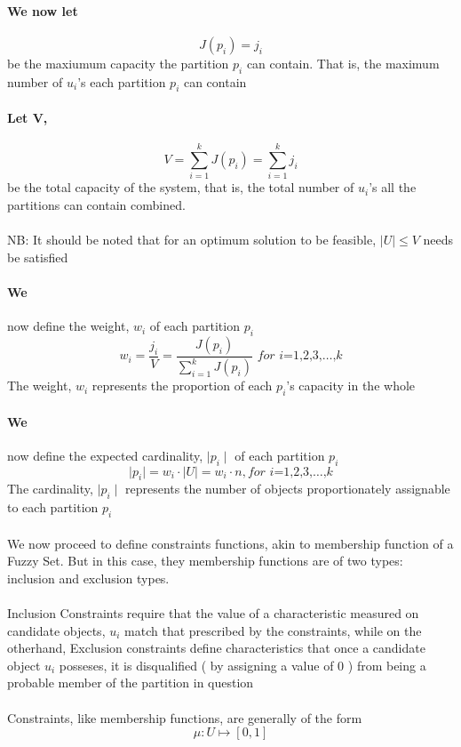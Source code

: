 \documentclass[a4paper]{book}
\begin{document}
		\paragraph{We now let}
			\begin{equation}
				J(p_i) = j_i
			\end{equation}
			be the maxiumum capacity the partition $p_i$ can contain. That is, the maximum number of $u_i$'s each partition $p_i$ can contain
		\paragraph{Let V,}
			\begin{equation}
				V = \sum_{ i = 1 }^{k}{J(p_i)} = \sum_{i=1}^{k}{j_i}
			\end{equation}
			be the total capacity of the system, that is, the total number of $u_i$'s all the partitions can contain combined.\\ \\
			NB: It should be noted that for an optimum solution to be feasible, $\mid U \mid \leq V$ needs be satisfied
		\paragraph{We}
			now define the weight, $w_i$ of each partition $p_i$
			\begin{equation}
				w_i = \frac{j_i}{V} = \frac{J(p_i)}{\sum_{i=1}^{k}{J(p_i)}}  \textit{ for i=1,2,3,}\dots\text{,}k
			\end{equation}
			The weight, $w_i$ represents the proportion of each $p_i$'s capacity in the whole
		\paragraph{We}
			now define the expected cardinality, $\mid p_i \mid$ of each partition $p_i$
			\begin{equation}
				\mid p_i \mid = w_i \cdot \mid U \mid = w_i \cdot n, \textit{for i=1,2,3,}\dots\text{,}k
			\end{equation}
			The cardinality, $\mid p_i \mid$ represents the number of objects proportionately assignable to each partition $p_i$
		\paragraph{}
			We now proceed to define constraints functions, akin to membership function of a Fuzzy Set. But in this case, they membership functions are of two types: inclusion and exclusion types.\\ \\
			Inclusion Constraints require that the value of a characteristic measured on candidate objects, $u_i$ match that prescribed by the constraints, while on the otherhand, Exclusion constraints define characteristics that once a candidate object $u_i$ posseses, it is disqualified ( by assigning a value of 0 ) from being a probable member of the partition in question\\ \\
			Constraints, like membership functions, are generally of the form
			\[
				\mu \colon U \mapsto [ 0,1 ]
			\]
			
\end{document}
